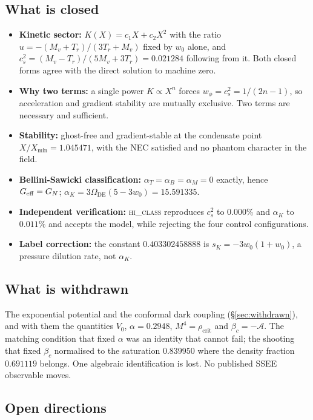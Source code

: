 \documentclass[12pt,a4paper]{article}
\newcommand{\AURA}{\mathcal{A}}
\newcommand{\Omde}{\Omega_{\mathrm{DE}}}
\newcommand{\rhocrit}{\rho_{\mathrm{crit}}}
\newcommand{\bc}{\beta_c}
\begin{document}
\subsection{What is closed}

\begin{itemize}
  \item \textbf{Kinetic sector:} $K(X) = c_1X + c_2X^2$ with the ratio
    $u = -(M_v+T_r)/(3T_r+M_v)$ fixed by $w_0$ alone, and
    $c_s^2 = (M_v-T_r)/(5M_v+3T_r) = 0.021284$ following from it.  Both
    closed forms agree with the direct solution to machine zero.
  \item \textbf{Why two terms:} a single power $K \propto X^n$ forces
    $w_\phi = c_s^2 = 1/(2n-1)$, so acceleration and gradient stability
    are mutually exclusive.  Two terms are necessary and sufficient.
  \item \textbf{Stability:} ghost-free and gradient-stable at the
    condensate point $X/X_{\min} = 1.045471$, with the NEC satisfied and
    no phantom character in the field.
  \item \textbf{Bellini-Sawicki classification:}
    $\alpha_T = \alpha_B = \alpha_M = 0$ exactly, hence
    $G_{\rm eff} = G_N$; $\alpha_K = 3\Omde(5-3w_0) = 15.591335$.
  \item \textbf{Independent verification:} \textsc{hi\_class} reproduces
    $c_s^2$ to $0.000\%$ and $\alpha_K$ to $0.011\%$ and accepts the
    model, while rejecting the four control configurations.
  \item \textbf{Label correction:} the constant $0.403302458888$ is
    $s_K = -3w_0(1+w_0)$, a pressure dilution rate, not $\alpha_K$.
\end{itemize}

\subsection{What is withdrawn}

The exponential potential and the conformal dark coupling
(§\ref{sec:withdrawn}), and with them the quantities $V_0$,
$\alpha = 0.2948$, $M^4 = \rhocrit$ and $\bc = -\AURA$.  The matching
condition that fixed $\alpha$ was an identity that cannot fail; the
shooting that fixed $\bc$ normalised to the saturation $0.839950$ where
the density fraction $0.691119$ belongs.  One algebraic identification
is lost.  No published SSEE observable moves.

\subsection{Open directions}
\end{document}
